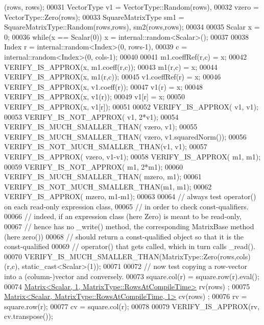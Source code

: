 \begin{DoxyCode}
      (rows, rows);
00031   VectorType v1 = VectorType::Random(rows),
00032              vzero = VectorType::Zero(rows);
00033   SquareMatrixType sm1 = SquareMatrixType::Random(rows,rows), sm2(rows,rows);
00034 
00035   Scalar x = 0;
00036   \textcolor{keywordflow}{while}(x == Scalar(0)) x = internal::random<Scalar>();
00037 
00038   Index r = internal::random<Index>(0, rows-1),
00039         c = internal::random<Index>(0, cols-1);
00040 
00041   m1.coeffRef(r,c) = x;
00042   VERIFY\_IS\_APPROX(x, m1.coeff(r,c));
00043   m1(r,c) = x;
00044   VERIFY\_IS\_APPROX(x, m1(r,c));
00045   v1.coeffRef(r) = x;
00046   VERIFY\_IS\_APPROX(x, v1.coeff(r));
00047   v1(r) = x;
00048   VERIFY\_IS\_APPROX(x, v1(r));
00049   v1[r] = x;
00050   VERIFY\_IS\_APPROX(x, v1[r]);
00051 
00052   VERIFY\_IS\_APPROX(               v1,    v1);
00053   VERIFY\_IS\_NOT\_APPROX(           v1,    2*v1);
00054   VERIFY\_IS\_MUCH\_SMALLER\_THAN(    vzero, v1);
00055   VERIFY\_IS\_MUCH\_SMALLER\_THAN(  vzero, v1.squaredNorm());
00056   VERIFY\_IS\_NOT\_MUCH\_SMALLER\_THAN(v1,    v1);
00057   VERIFY\_IS\_APPROX(               vzero, v1-v1);
00058   VERIFY\_IS\_APPROX(               m1,    m1);
00059   VERIFY\_IS\_NOT\_APPROX(           m1,    2*m1);
00060   VERIFY\_IS\_MUCH\_SMALLER\_THAN(    mzero, m1);
00061   VERIFY\_IS\_NOT\_MUCH\_SMALLER\_THAN(m1,    m1);
00062   VERIFY\_IS\_APPROX(               mzero, m1-m1);
00063 
00064   \textcolor{comment}{// always test operator() on each read-only expression class,}
00065   \textcolor{comment}{// in order to check const-qualifiers.}
00066   \textcolor{comment}{// indeed, if an expression class (here Zero) is meant to be read-only,}
00067   \textcolor{comment}{// hence has no \_write() method, the corresponding MatrixBase method (here zero())}
00068   \textcolor{comment}{// should return a const-qualified object so that it is the const-qualified}
00069   \textcolor{comment}{// operator() that gets called, which in turn calls \_read().}
00070   VERIFY\_IS\_MUCH\_SMALLER\_THAN(MatrixType::Zero(rows,cols)(r,c), static\_cast<Scalar>(1));
00071 
00072   \textcolor{comment}{// now test copying a row-vector into a (column-)vector and conversely.}
00073   square.col(r) = square.row(r).eval();
00074   \hyperlink{group___core___module_class_eigen_1_1_matrix}{Matrix<Scalar, 1, MatrixType::RowsAtCompileTime>} rv(rows)
      ;
00075   \hyperlink{group___core___module_class_eigen_1_1_matrix}{Matrix<Scalar, MatrixType::RowsAtCompileTime, 1>} cv(rows)
      ;
00076   rv = square.row(r);
00077   cv = square.col(r);
00078   
00079   VERIFY\_IS\_APPROX(rv, cv.transpose());

\end{DoxyCode}
